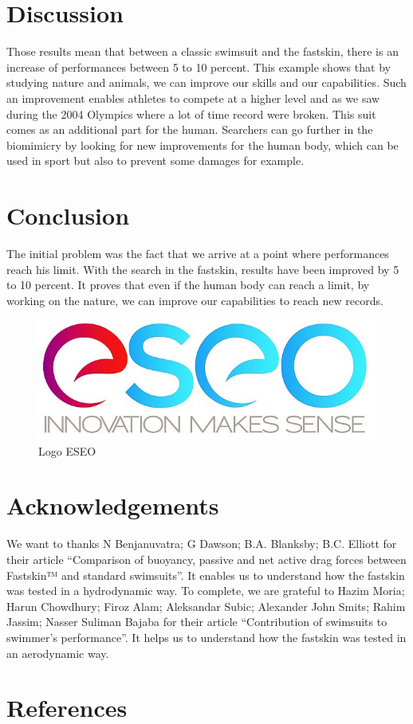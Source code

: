 \documentclass[twoside,twocolumn]{article}                          %
\begin{document}
\section{Discussion}
Those results mean that between a classic swimsuit and the fastskin, there is an increase of performances between 5 to 10 percent. This example shows that by studying nature and animals, we can improve our skills and our capabilities. Such an improvement enables athletes to compete at a higher level and as we saw during the 2004 Olympics where a lot of time record were broken.
This suit comes as an additional part for the human. Searchers can go further in the biomimicry by looking for new improvements for the human body, which can be used in sport but also to prevent some damages for example. 


\section{Conclusion}
The initial problem was the fact that we arrive at a point where performances reach his limit. With the search in the fastskin, results have been improved by 5 to 10 percent. It proves that even if the human body can reach a limit, by working on the nature, we can improve our capabilities to reach new records.

\cite{Swimsuits}
\cite{Fastskin}

\begin{figure}[!h]
  \begin{center}
    \includegraphics[scale=0.2]{eseo.JPG}
  \end{center}
  \caption{Logo ESEO}
\end{figure}


\section{Acknowledgements}
We want to thanks N Benjanuvatra; G Dawson; B.A. Blanksby; B.C. Elliott for their article “Comparison of buoyancy, passive and net active drag forces between Fastskin™ and standard swimsuits”. It enables us to understand how the fastskin was tested in a hydrodynamic way. 
To complete, we are grateful to Hazim Moria; Harun Chowdhury; Firoz Alam; Aleksandar Subic; Alexander John Smits; Rahim Jassim; Nasser Suliman Bajaba for their article “Contribution of swimsuits to swimmer’s performance”. It helps us to understand how the fastskin was tested in an aerodynamic way. 


\section{References}


\end{document}
